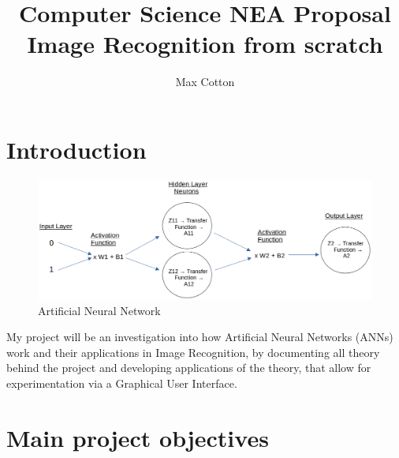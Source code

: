 \documentclass[10pt,a4paper]{article}
\title{Computer Science NEA Proposal
       \bigbreak
       \large Image Recognition from scratch}
\author{Max Cotton}
\date{}
\begin{document}
\maketitle

\section{Introduction}
\begin{figure}[h!]
\centering
\includegraphics[width=1\textwidth]{./write-up/src/images/shallow-ann-diagram.png}
\caption{Artificial Neural Network}
\end{figure}

My project will be an investigation into how Artificial Neural Networks (ANNs) work and their applications in Image Recognition, by documenting all theory behind the 
project and developing applications of the theory, that allow for experimentation via a Graphical User Interface. 

\section{Main project objectives}
\end{document}
